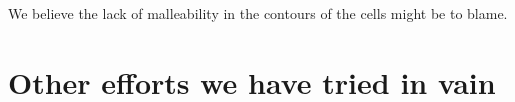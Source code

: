 We believe the lack of malleability in the contours of the cells might be to blame.






\section*{Other efforts we have tried in vain}

